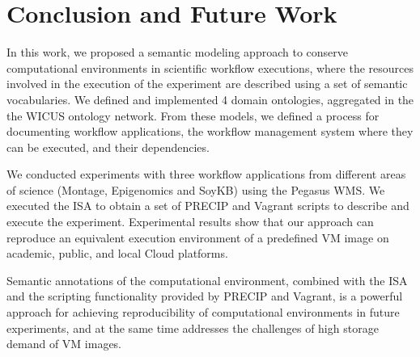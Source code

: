 \section{Conclusion and Future Work}
\label{sec:conclusion}



In this work, we proposed a semantic modeling approach to conserve computational environments in scientific workflow executions, where  the resources involved in the execution of the experiment are described using a set of semantic vocabularies. We defined and implemented 4 domain ontologies, aggregated in the the WICUS ontology network. From these models, we defined a process for documenting workflow applications, the workflow management system where they can be executed, and their dependencies. 

We conducted experiments with three workflow applications from different areas of science (Montage, Epigenomics and SoyKB) using the Pegasus WMS. We executed the ISA to obtain a set of PRECIP and Vagrant scripts to describe and execute the experiment. Experimental results show that our approach can reproduce an equivalent execution environment of a predefined VM image on academic, public, and local Cloud platforms.

Semantic annotations of the computational environment, combined with the ISA and the scripting functionality provided by PRECIP and Vagrant, is a powerful approach for achieving reproducibility of computational environments in future experiments, and at the same time addresses the challenges of high storage demand of VM images. 

